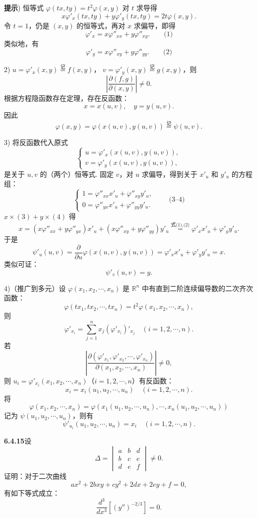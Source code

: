 \documentclass[UTF8, 12pt, fontset=fandol, oneside]{ctexart}
\begin{document}
\noindent\textbf{提示}) 恒等式 $\varphi(tx,ty)=t^2\varphi(x,y)$ 对 $t$ 求导得
\[
  x\varphi'_x(tx,ty)+y\varphi'_y(tx,ty)=2t\varphi(x,y).
\]
令 $t=1$，仍是 $(x,y)$ 的恒等式，再对 $x$ 求偏导，即得
\[
  \varphi'_x=x\varphi''_{xx}+y\varphi''_{xy}. \qquad\text{(1)}
\]
类似地，有
\[
  \varphi'_y=x\varphi''_{xy}+y\varphi''_{yy}. \qquad\text{(2)}
\]

2) $u=\varphi'_x(x,y)\overset{\text{记}}{=}f(x,y)$，
$v=\varphi'_y(x,y)\overset{\text{记}}{=}g(x,y)$，则
\[
  \left|\frac{\partial(f,g)}{\partial(x,y)}\right|\ne0.
\]
根据方程隐函数存在定理，存在反函数：
\[
  x=x(u,v),\quad y=y(u,v).
\]
因此
\[
  \varphi(x,y)=\varphi(x(u,v),y(u,v))\overset{\text{记}}{=}\psi(u,v).
\]

3) 将反函数代入原式
\[
\begin{cases}
  u=\varphi'_x(x(u,v),y(u,v)),\\
  v=\varphi'_y(x(u,v),y(u,v)),
\end{cases}
\]
是关于 $u,v$ 的（两个）恒等式. 固定 $v$，对 $u$ 求偏导，得到关于 $x'_u$ 和 $y'_u$ 的方程组：
\[
\begin{cases}
  1=\varphi''_{xx}x'_u+\varphi''_{xy}y'_u,\\
  0=\varphi''_{yx}x'_u+\varphi''_{yy}y'_u.
\end{cases}\qquad\text{(3--4)}
\]
$x\times(3)+y\times(4)$ 得
\[
  x=(x\varphi''_{xx}+y\varphi''_{yx})x'_u
  +(x\varphi''_{xy}+y\varphi''_{yy})y'_u
  \overset{\text{式(1),(2)}}{=}
  \varphi'_x x'_u+\varphi'_y y'_u.
\]
于是
\[
  \psi'_u(u,v)=\frac{\partial}{\partial u}\varphi(x(u,v),y(u,v))
  =\varphi'_x x'_u+\varphi'_y y'_u=x.
\]
类似可证：
\[
  \psi'_v(u,v)=y.
\]

4)（推广到多元）设 $\varphi(x_1,x_2,\cdots,x_n)$ 是 $\mathbb R^n$ 中有直到二阶连续偏导数的二次齐次函数：
\[
  \varphi(tx_1,tx_2,\cdots,tx_n)=t^2\varphi(x_1,x_2,\cdots,x_n),
\]
则
\[
  \varphi'_{x_i}=\sum_{j=1}^n x_j(\varphi'_{x_i})'_{x_j}
  \quad(i=1,2,\cdots,n).
\]
若
\[
  \left|
  \frac{\partial(\varphi'_{x_1},\varphi'_{x_2},\cdots,\varphi'_{x_n})}
       {\partial(x_1,x_2,\cdots,x_n)}
  \right|\ne0,
\]
则 $u_i=\varphi'_{x_i}(x_1,x_2,\cdots,x_n)$（$i=1,2,\cdots,n$）有反函数：
\[
  x_i=x_i(u_1,u_2,\cdots,u_n)\quad(i=1,2,\cdots,n).
\]
将
\[
  \varphi(x_1,x_2,\cdots,x_n)
  =
  \varphi(x_1(u_1,u_2,\cdots,u_n),\cdots,x_n(u_1,u_2,\cdots,u_n))
\]
记为 $\psi(u_1,u_2,\cdots,u_n)$，则有
\[
  \psi'_{u_i}(u_1,u_2,\cdots,u_n)=x_i\quad(i=1,2,\cdots,n).
\]

\noindent\textbf{6.4.15}\quad 设
\[
  \Delta=
  \begin{vmatrix}
    a&b&d\\
    b&c&e\\
    d&e&f
  \end{vmatrix}\ne0.
\]
证明：对于二次曲线
\[
  ax^2+2bxy+cy^2+2dx+2ey+f=0,
\]
有如下等式成立：
\[
  \frac{d^3}{dx^3}\left[(y'')^{-2/3}\right]=0.
\]
\end{document}
